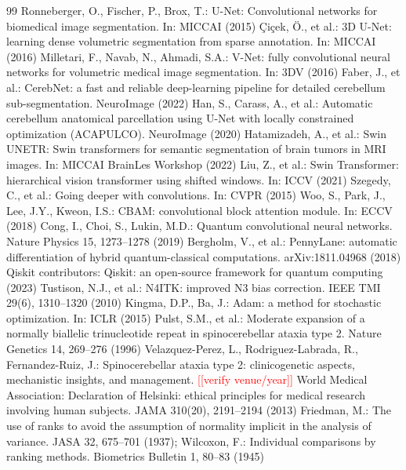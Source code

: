 \documentclass[runningheads]{llncs}
\newcommand{\todo}[1]{\textcolor{red}{[[#1]]}}
\begin{document}
\begin{thebibliography}{99}
 Ronneberger, O., Fischer, P., Brox, T.: U-Net: Convolutional networks for biomedical image segmentation. In: MICCAI (2015)
 \c{C}i\c{c}ek, \"O., et al.: 3D U-Net: learning dense volumetric segmentation from sparse annotation. In: MICCAI (2016)
 Milletari, F., Navab, N., Ahmadi, S.A.: V-Net: fully convolutional neural networks for volumetric medical image segmentation. In: 3DV (2016)
 Faber, J., et al.: CerebNet: a fast and reliable deep-learning pipeline for detailed cerebellum sub-segmentation. NeuroImage (2022)
 Han, S., Carass, A., et al.: Automatic cerebellum anatomical parcellation using U-Net with locally constrained optimization (ACAPULCO). NeuroImage (2020)
 Hatamizadeh, A., et al.: Swin UNETR: Swin transformers for semantic segmentation of brain tumors in MRI images. In: MICCAI BrainLes Workshop (2022)
 Liu, Z., et al.: Swin Transformer: hierarchical vision transformer using shifted windows. In: ICCV (2021)
 Szegedy, C., et al.: Going deeper with convolutions. In: CVPR (2015)
 Woo, S., Park, J., Lee, J.Y., Kweon, I.S.: CBAM: convolutional block attention module. In: ECCV (2018)
 Cong, I., Choi, S., Lukin, M.D.: Quantum convolutional neural networks. Nature Physics 15, 1273--1278 (2019)
 Bergholm, V., et al.: PennyLane: automatic differentiation of hybrid quantum-classical computations. arXiv:1811.04968 (2018)
 Qiskit contributors: Qiskit: an open-source framework for quantum computing (2023)
 Tustison, N.J., et al.: N4ITK: improved N3 bias correction. IEEE TMI 29(6), 1310--1320 (2010)
 Kingma, D.P., Ba, J.: Adam: a method for stochastic optimization. In: ICLR (2015)
 Pulst, S.M., et al.: Moderate expansion of a normally biallelic trinucleotide repeat in spinocerebellar ataxia type 2. Nature Genetics 14, 269--276 (1996)
 Velazquez-Perez, L., Rodriguez-Labrada, R., Fernandez-Ruiz, J.: Spinocerebellar ataxia type 2: clinicogenetic aspects, mechanistic insights, and management. \todo{verify venue/year}
 World Medical Association: Declaration of Helsinki: ethical principles for medical research involving human subjects. JAMA 310(20), 2191--2194 (2013)
 Friedman, M.: The use of ranks to avoid the assumption of normality implicit in the analysis of variance. JASA 32, 675--701 (1937); Wilcoxon, F.: Individual comparisons by ranking methods. Biometrics Bulletin 1, 80--83 (1945)
\end{thebibliography}
\end{document}
